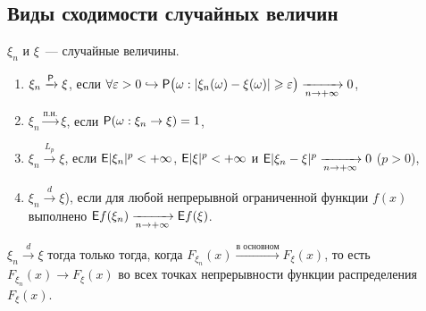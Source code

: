  \subsection{Виды сходимости случайных величин}
 \begin{definition}
    $\xi_n$ и $\xi$~--- случайные величины. 
 	\begin{enumerate}
 		\item $\xi_n \xrightarrow{\P} \xi$, если 
 			$\forall \varepsilon > 0 \hookrightarrow \P\big(\omega:|\xi_n(\omega) - \xi(\omega)| 
 			\geqslant \varepsilon \big) \limn 0$,
 		\item $\xi_n \xrightarrow{\text{п.н.}} \xi$, если 
 			$\P(\omega: \xi_n \rightarrow \xi) = 1$,
 		\item $\xi_n \xrightarrow{L_p} \xi$, если $\E |\xi_n |^p < + \infty$, $\E |\xi|^p < +\infty$ и $\E | \xi_n - \xi |^p \limn 0$ ($p > 0$),
 		\item $\xi_n \xrightarrow{d} \xi$), если для любой непрерывной ограниченной функции $f(x)$ выполнено $\E f (\xi_n) \limn \E f(\xi)$.
 	\end{enumerate}
 \end{definition}
 \begin{theorem}[Александрова][б/д]
 	$\xi_n \xrightarrow{d} \xi$ тогда только тогда, когда 
 	$F_{\xi_n}(x) \xrightarrow{\text{в основном}} F_\xi (x)$, то есть 
 	$F_{\xi_n}(x) \rightarrow F_\xi(x)$ во всех точках непрерывности 
 	функции распределения $F_\xi(x)$. 
 \end{theorem}
